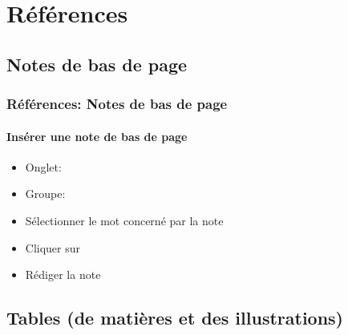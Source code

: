 \documentclass[xcolor=table]{beamer}
\begin{document}
\section{Références}

%

\subsection{Notes de bas de page}

\begin{frame}[t]
\frametitle{Références: Notes de bas de page}
\framesubtitle{Insérer une note de bas de page}

\begin{minipage}{0.69\textwidth}
\begin{itemize}
	\item Onglet: 
	\item Groupe: 
\end{itemize}
\end{minipage}
\begin{minipage}{0.30\textwidth}
\end{minipage}

\begin{itemize}
	\item Sélectionner le mot concerné par la note
	\item Cliquer sur 
	\item Rédiger la note
\end{itemize}

\end{frame}

\subsection{Tables (de matières et des illustrations)}
\end{document}
